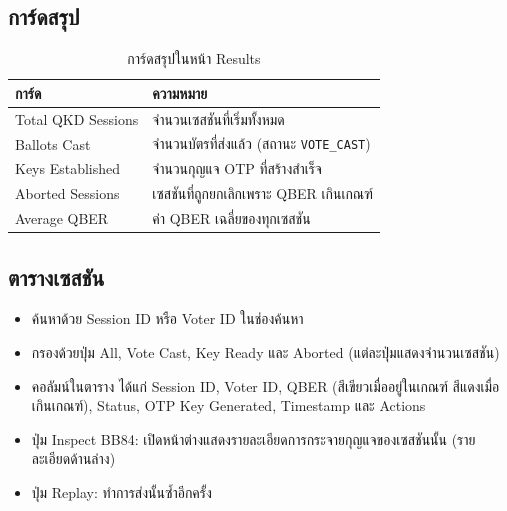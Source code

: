 \subsection{การ์ดสรุป}
\begin{table}[htbp]
\centering
\begin{tabular}{|l|p{9.5cm}|}
\hline
\textbf{การ์ด} & \textbf{ความหมาย} \\ \hline
Total QKD Sessions & จำนวนเซสชันที่เริ่มทั้งหมด \\ \hline
Ballots Cast & จำนวนบัตรที่ส่งแล้ว (สถานะ \texttt{VOTE\_CAST}) \\ \hline
Keys Established & จำนวนกุญแจ OTP ที่สร้างสำเร็จ \\ \hline
Aborted Sessions & เซสชันที่ถูกยกเลิกเพราะ QBER เกินเกณฑ์ \\ \hline
Average QBER & ค่า QBER เฉลี่ยของทุกเซสชัน \\ \hline
\end{tabular}
\caption{การ์ดสรุปในหน้า Results}
\label{tab:manual-cards}
\end{table}

\subsection{ตารางเซสชัน}
\begin{itemize}
  \item ค้นหาด้วย Session ID หรือ Voter ID ในช่องค้นหา
  \item กรองด้วยปุ่ม All, Vote Cast, Key Ready และ Aborted (แต่ละปุ่มแสดงจำนวนเซสชัน)
  \item คอลัมน์ในตาราง ได้แก่ Session ID, Voter ID, QBER (สีเขียวเมื่ออยู่ในเกณฑ์ สีแดงเมื่อเกินเกณฑ์),
        Status, OTP Key Generated, Timestamp และ Actions
  \item ปุ่ม Inspect BB84: เปิดหน้าต่างแสดงรายละเอียดการกระจายกุญแจของเซสชันนั้น (รายละเอียดด้านล่าง)
  \item ปุ่ม Replay: ทำการส่งนั้นซ้ำอีกครั้ง
\end{itemize}

